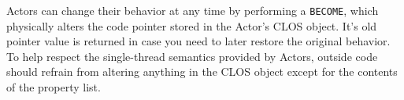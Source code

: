 \documentclass[article,oneside]{memoir}
\begin{document}
Actors can change their behavior at any time by performing a \texttt{BECOME}, which physically alters the code pointer stored in the Actor's CLOS object. It's old pointer value is returned in case you need to later restore the original behavior. To help respect the single-thread semantics provided by Actors, outside code should refrain from altering anything in the CLOS object except for the contents of the property list.
\end{document}
